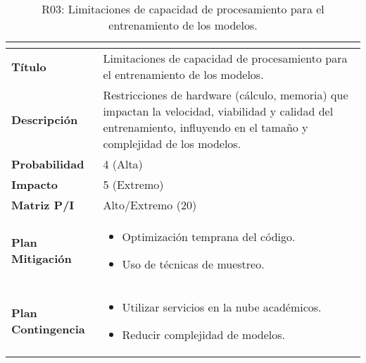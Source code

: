 \begin{table}[H]
\centering
\begin{tabular}{|>{\bfseries}l|p{10cm}|}
\hline
\rowcolor{lightgray}
\multicolumn{2}{|c|}{\textbf{Riesgo R03}} \\ \hline
Título & Limitaciones de capacidad de procesamiento para el entrenamiento de los modelos. \\ \hline
Descripción & Restricciones de hardware (cálculo, memoria) que impactan la velocidad, viabilidad y calidad del entrenamiento, influyendo en el tamaño y complejidad de los modelos.\\ \hline
Probabilidad & 4 (Alta) \\ \hline
Impacto & 5 (Extremo) \\ \hline
Matriz P/I & Alto/Extremo (20)\\ \hline
Plan Mitigación & 
\begin{itemize}
\item Optimización temprana del código.
\item Uso de técnicas de muestreo.
\end{itemize} \\ \hline
Plan Contingencia & 
\begin{itemize}
\item Utilizar servicios en la nube académicos.
\item Reducir complejidad de modelos.
\end{itemize} \\ \hline
\end{tabular}
\caption{R03: Limitaciones de capacidad de procesamiento para el entrenamiento de los modelos.}
\label{tab:R03}
\end{table}

